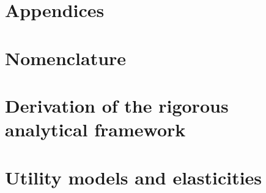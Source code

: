 \documentclass[12pt]{article}\usepackage[]{graphicx}\usepackage[]{xcolor}
\begin{document}
{
\scriptsize

}


\clearpage

\appendix
{}

\section*{Appendices}

\renewcommand{\thesection}{\Alph{section}}


\section{Nomenclature}
\label{sec:nomenclature}




\section{Derivation of the rigorous analytical framework}
\label{sec:derivation}




\section{Utility models and elasticities}
\label{sec:utility_and_elasticities}


\end{document}
